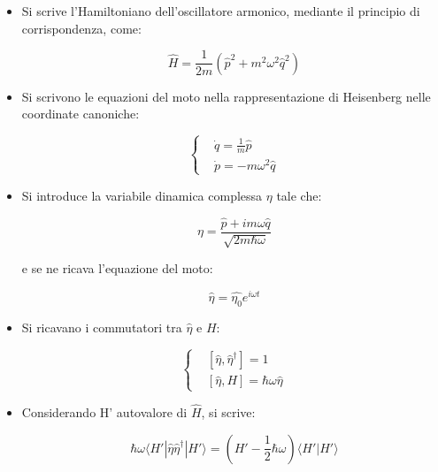 \documentclass{report}
\begin{document}
\begin{itemize}
  \item Si scrive l'Hamiltoniano dell'oscillatore armonico, mediante il principio di corrispondenza, come:

        \begin{equation}
          \hat{H}=\frac{1}{2m}(\hat{p}^2+m^2\omega^2\hat{q}^2)
        \end{equation}
  \item Si scrivono le equazioni del moto nella rappresentazione di Heisenberg nelle coordinate canoniche:

        \begin{equation}
          \left\{
          \begin{aligned}
             & \dot{q}=\frac{1}{m}\hat{p} \\
             & \dot{p}=-m\omega^2\hat{q}
          \end{aligned}
          \right.
        \end{equation}

  \item Si introduce la variabile dinamica complessa $\eta$ tale che:

        \begin{equation}
          \eta= \frac{\hat{p}+im\omega \hat{q}}{\sqrt{2m\hbar \omega}}
        \end{equation}

        e se ne ricava l'equazione del moto:

        \begin{equation}
          \hat{\eta}=\hat{\eta_0} e^{i\omega t}
        \end{equation}

  \item Si ricavano i commutatori tra $\hat{\eta}$ e $H$:

        \begin{equation}
          \left\{
          \begin{aligned}
             & [\hat{\eta},\hat{\eta}^{\dagger}]=1    \\
             & [\hat{\eta},H]=\hbar \omega \hat{\eta}
          \end{aligned}
          \right.
        \end{equation}

  \item Considerando H' autovalore di $\hat{H}$, si scrive:

        \begin{equation}
          \hbar \omega\langle H' |\hat{\eta}\hat{\eta}^{\dagger}|H'\rangle =(H'-\frac{1}{2}\hbar \omega)\langle H' |H'\rangle
        \end{equation}


\end{itemize}
\end{document}
